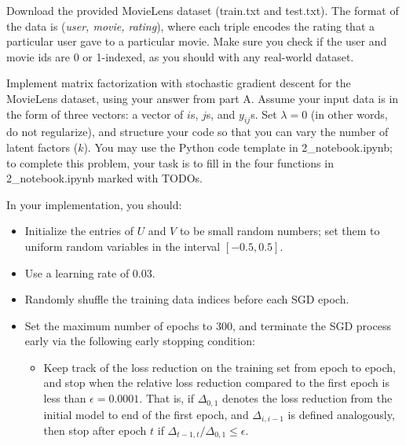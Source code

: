 \begin{solution}

\end{solution}

\problem[10]
Download the provided MovieLens dataset (train.txt and test.txt).  The format of the data is (\emph{user, movie, rating}), where each triple encodes the rating that a particular user gave to a particular movie. Make sure you check if the user and movie ids are 0 or 1-indexed, as you should with any real-world dataset.

Implement matrix factorization with stochastic gradient descent for the MovieLens dataset, using your answer from part A. Assume your input data is in the form of three vectors: a vector of $i$s, $j$s, and $y_{ij}$s. Set $\lambda = 0$ (in other words, do not regularize), and structure your code so that you can vary the number of latent factors ($k$). You may use the Python code template in 2_notebook.ipynb; to complete this problem, your task is to fill in the four functions in 2_notebook.ipynb marked with TODOs.

In your implementation, you should:

\begin{itemize}
\item Initialize the entries of $U$ and $V$ to be small random numbers; set them to uniform random variables in the interval $[-0.5, 0.5]$.
\item Use a learning rate of 0.03.
\item Randomly shuffle the training data indices before each SGD epoch.
\item Set the maximum number of epochs to 300, and terminate the SGD process early via the following early stopping condition:
\begin{itemize}
\item Keep track of the loss reduction on the training set from epoch to epoch, and stop when the relative loss reduction compared to the first epoch is less than $\epsilon = 0.0001$.  That is, if $\Delta_{0,1}$ denotes the loss reduction from the initial model to end of the first epoch, and $\Delta_{i, i-1}$ is defined analogously, then stop after epoch $t$ if $\Delta_{t-1,t} / \Delta_{0,1} \leq \epsilon$.
\end{itemize}
\end{itemize}


